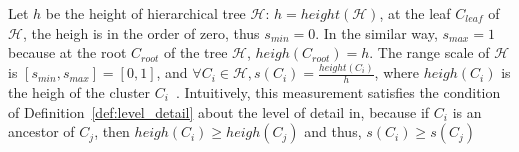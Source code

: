 Let $h$ be the height of hierarchical tree $\mathcal{H}$: $h = height(\mathcal{H})$, at the leaf $C_{leaf}$ of $\mathcal{H}$, the heigh is in the order of zero, thus $s_{min} = 0$. In the similar way, $s_{max} = 1$ because at the root $C_{root}$ of the tree $\mathcal{H}$, $heigh(C_{root}) = h$.  The range scale of $\mathcal{H}$ is $[s_{min}, s_{max}] = [0,1]$, and $\forall C_i \in \mathcal{H}, s(C_i) = \frac{height(C_i)}{h}$, where $heigh(C_i)$ is the heigh of the cluster $C_i$~\cite{yang2003interactive}. Intuitively, this measurement satisfies the condition of Definition~\ref{def:level_detail} about the level of detail in, because if $C_i$ is an ancestor of $C_j$, then $heigh(C_i) \geq heigh(C_j)$ and thus, $s(C_i) \geq s(C_j)$


